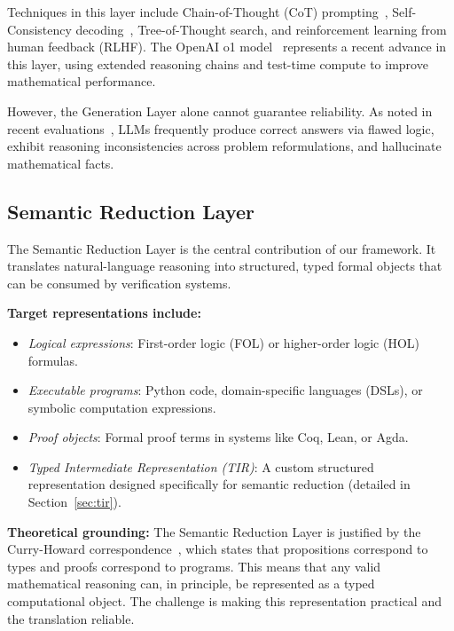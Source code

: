 \documentclass[11pt,a4paper]{article}
\begin{document}
Techniques in this layer include Chain-of-Thought (CoT) prompting~\cite{wei2022chain}, Self-Consistency decoding~\cite{wang2022self}, Tree-of-Thought search, and reinforcement learning from human feedback (RLHF). The OpenAI o1 model~\cite{openai2024learning} represents a recent advance in this layer, using extended reasoning chains and test-time compute to improve mathematical performance.

However, the Generation Layer alone cannot guarantee reliability. As noted in recent evaluations~\cite{liang2024mathcheck, huang2025hallucination}, LLMs frequently produce correct answers via flawed logic, exhibit reasoning inconsistencies across problem reformulations, and hallucinate mathematical facts.

\subsection{Semantic Reduction Layer}
\label{sec:semantic}

The Semantic Reduction Layer is the central contribution of our framework. It translates natural-language reasoning into structured, typed formal objects that can be consumed by verification systems.

\textbf{Target representations include:}
\begin{itemize}[leftmargin=*]
    \item \textit{Logical expressions}: First-order logic (FOL) or higher-order logic (HOL) formulas.
    \item \textit{Executable programs}: Python code, domain-specific languages (DSLs), or symbolic computation expressions.
    \item \textit{Proof objects}: Formal proof terms in systems like Coq, Lean, or Agda.
    \item \textit{Typed Intermediate Representation (TIR)}: A custom structured representation designed specifically for semantic reduction (detailed in Section~\ref{sec:tir}).
\end{itemize}

\textbf{Theoretical grounding:} The Semantic Reduction Layer is justified by the Curry-Howard correspondence~\cite{howard1980formulae}, which states that propositions correspond to types and proofs correspond to programs. This means that any valid mathematical reasoning can, in principle, be represented as a typed computational object. The challenge is making this representation practical and the translation reliable.
\end{document}
